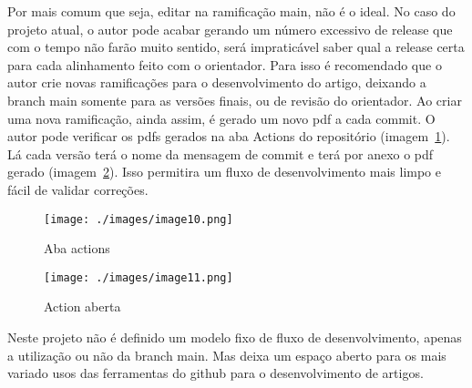 Por mais comum que seja, editar na ramificação main, não é o ideal. No caso do projeto atual, o autor pode acabar gerando um número excessivo de release que com o tempo não farão muito sentido, será impraticável saber qual a release certa para cada alinhamento feito com o orientador. Para isso é recomendado que o autor crie novas ramificações para o desenvolvimento do artigo, deixando a branch main somente para as versões finais, ou de revisão do orientador.
Ao criar uma nova ramificação, ainda assim, é gerado um novo pdf a cada commit. O autor pode verificar os pdfs gerados na aba Actions do repositório (imagem~\ref{fig:image10}). Lá cada versão terá o nome da mensagem de commit e terá por anexo o pdf gerado (imagem~\ref{fig:image11}). Isso permitira um fluxo de desenvolvimento mais limpo e fácil de validar correções.



\begin{figure}[ht]
	\centering
	\texttt{[image: ./images/image10.png]}
	\caption{Aba actions}
	\label{fig:image10}
\end{figure}


\begin{figure}[ht]
	\centering
	\texttt{[image: ./images/image11.png]}
	\caption{Action aberta}
	\label{fig:image11}
\end{figure}

Neste projeto não é definido um modelo fixo de fluxo de desenvolvimento, apenas a utilização ou não da branch main. Mas deixa um espaço aberto para os mais variado usos das ferramentas do github para o desenvolvimento de artigos.

